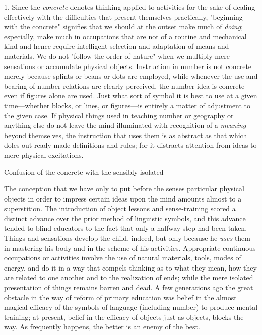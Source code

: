 \documentclass[letterpaper]{book}
\begin{document}
1. Since the \emph{concrete} denotes thinking applied to activities for
the sake of dealing effectively with the difficulties that present
themselves practically, "beginning with the concrete" signifies that we
should at the outset make much of \emph{doing}; especially, make much in
occupations that are not of a routine and mechanical kind and hence
require intelligent selection and adaptation of means and materials. We
do not "follow the order of nature" when we multiply mere sensations or
accumulate physical objects. Instruction in number is not concrete
merely because splints or beans or dots are employed, while whenever the
use and bearing of number relations are clearly perceived, the number
idea is concrete even if figures alone are used. Just what sort
of
symbol it is best to use at a given time---whether blocks, or lines, or
figures---is entirely a matter of adjustment to the given case. If
physical things used in teaching number or geography or anything else do
not leave the mind illuminated with recognition of a \emph{meaning}
beyond themselves, the instruction that uses them is as abstract as that
which doles out ready-made definitions and rules; for it distracts
attention from ideas to mere physical excitations.

Confusion of the concrete with the sensibly isolated

The conception that we have only to put before the senses particular
physical objects in order to impress certain ideas upon the mind amounts
almost to a superstition. The introduction of object lessons and
sense-training scored a distinct advance over the prior method of
linguistic symbols, and this advance tended to blind educators to the
fact that only a halfway step had been taken. Things and sensations
develop the child, indeed, but only because he \emph{uses} them in
mastering his body and in the scheme of his activities. Appropriate
continuous occupations or activities involve the use of natural
materials, tools, modes of energy, and do it in a way that compels
thinking as to what they mean, how they are related to one another and
to the realization of ends; while the mere isolated presentation of
things remains barren and dead. A few generations ago the great obstacle
in the way of reform of primary education was belief in the almost
magical efficacy of the symbols of language (including number) to
produce mental training; at present, belief in the efficacy of objects
just as objects, blocks the way. As frequently happens, the better is an
enemy of the best.
\end{document}
